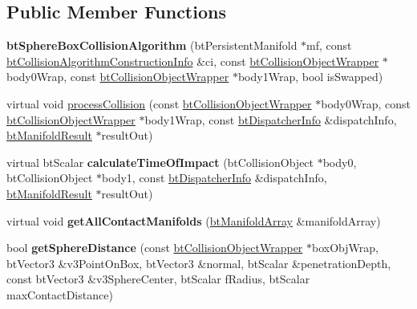 \subsection*{Public Member Functions}
\begin{DoxyCompactItemize}
\item 
\hypertarget{classbt_sphere_box_collision_algorithm_a0d289a90663e6b7a7863ba6530c3de78}{{\bfseries bt\+Sphere\+Box\+Collision\+Algorithm} (bt\+Persistent\+Manifold $\ast$mf, const \hyperlink{structbt_collision_algorithm_construction_info}{bt\+Collision\+Algorithm\+Construction\+Info} \&ci, const \hyperlink{structbt_collision_object_wrapper}{bt\+Collision\+Object\+Wrapper} $\ast$body0\+Wrap, const \hyperlink{structbt_collision_object_wrapper}{bt\+Collision\+Object\+Wrapper} $\ast$body1\+Wrap, bool is\+Swapped)}\label{classbt_sphere_box_collision_algorithm_a0d289a90663e6b7a7863ba6530c3de78}

\item 
virtual void \hyperlink{classbt_sphere_box_collision_algorithm_ab171b2afeabaaaa8a51728426643c369}{process\+Collision} (const \hyperlink{structbt_collision_object_wrapper}{bt\+Collision\+Object\+Wrapper} $\ast$body0\+Wrap, const \hyperlink{structbt_collision_object_wrapper}{bt\+Collision\+Object\+Wrapper} $\ast$body1\+Wrap, const \hyperlink{structbt_dispatcher_info}{bt\+Dispatcher\+Info} \&dispatch\+Info, \hyperlink{classbt_manifold_result}{bt\+Manifold\+Result} $\ast$result\+Out)
\item 
\hypertarget{classbt_sphere_box_collision_algorithm_adb1982e2585bfcf69dadc4d6b2305fa4}{virtual bt\+Scalar {\bfseries calculate\+Time\+Of\+Impact} (bt\+Collision\+Object $\ast$body0, bt\+Collision\+Object $\ast$body1, const \hyperlink{structbt_dispatcher_info}{bt\+Dispatcher\+Info} \&dispatch\+Info, \hyperlink{classbt_manifold_result}{bt\+Manifold\+Result} $\ast$result\+Out)}\label{classbt_sphere_box_collision_algorithm_adb1982e2585bfcf69dadc4d6b2305fa4}

\item 
\hypertarget{classbt_sphere_box_collision_algorithm_ac506db81f3885ed079b902817a6d7803}{virtual void {\bfseries get\+All\+Contact\+Manifolds} (\hyperlink{classbt_aligned_object_array}{bt\+Manifold\+Array} \&manifold\+Array)}\label{classbt_sphere_box_collision_algorithm_ac506db81f3885ed079b902817a6d7803}

\item 
\hypertarget{classbt_sphere_box_collision_algorithm_a84fb21901c8dbbf9c8fca70ac173721f}{bool {\bfseries get\+Sphere\+Distance} (const \hyperlink{structbt_collision_object_wrapper}{bt\+Collision\+Object\+Wrapper} $\ast$box\+Obj\+Wrap, bt\+Vector3 \&v3\+Point\+On\+Box, bt\+Vector3 \&normal, bt\+Scalar \&penetration\+Depth, const bt\+Vector3 \&v3\+Sphere\+Center, bt\+Scalar f\+Radius, bt\+Scalar max\+Contact\+Distance)}\label{classbt_sphere_box_collision_algorithm_a84fb21901c8dbbf9c8fca70ac173721f}


\end{DoxyCompactItemize}
